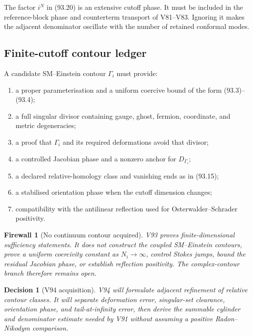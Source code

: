 \documentclass[11pt]{article}
\newtheorem{firewall}[theorem]{Firewall}
\newtheorem{decision}[theorem]{Decision}
\begin{document}
\begin{warning}
\label{warn:v11v93-dimension}
The factor \(i^N\) in (93.20) is an extensive cutoff phase.  It must
be included in the reference-block phase and counterterm transport of
V81--V83.  Ignoring it makes the adjacent denominator oscillate with
the number of retained conformal modes.
\end{warning}

\subsection{Finite-cutoff contour ledger}

A candidate SM--Einstein contour \(\Gamma_i\) must provide:
\begin{enumerate}
\item a proper parameterisation and a uniform coercive bound of the
      form (93.3)--(93.4);
\item a full singular divisor containing gauge, ghost, fermion,
      coordinate, and metric degeneracies;
\item a proof that \(\Gamma_i\) and its required deformations avoid
      that divisor;
\item a controlled Jacobian phase and a nonzero anchor for
      \(D_{\Gamma_i}\);
\item a declared relative-homology class and vanishing ends as in
      (93.15);
\item a stabilised orientation phase when the cutoff dimension
      changes;
\item compatibility with the antilinear reflection used for
      Osterwalder--Schrader positivity.
\end{enumerate}

\begin{firewall}[No continuum contour acquired]
\label{fire:v11v93-boundary}
V93 proves finite-dimensional sufficiency statements.  It does not
construct the coupled SM--Einstein contours, prove a uniform
coercivity constant as \(N_i\to\infty\), control Stokes jumps, bound
the residual Jacobian phase, or establish reflection positivity.
The complex-contour branch therefore remains open.
\end{firewall}

\begin{decision}[V94 acquisition]
\label{dec:v11v93-next}
V94 will formulate adjacent refinement of relative contour classes.
It will separate deformation error, singular-set clearance,
orientation phase, and tail-at-infinity error, then derive the
summable cylinder and denominator estimate needed by V91 without
assuming a positive Radon--Nikodym comparison.
\end{decision}
\end{document}
